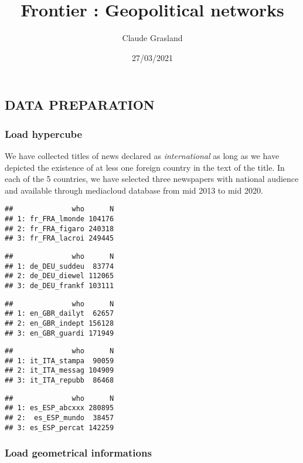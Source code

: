 \documentclass[
]{article}
\title{Frontier : Geopolitical networks}
\author{Claude Grasland}
\date{27/03/2021}
\begin{document}
\maketitle

\hypertarget{data-preparation}{%
\subsection{DATA PREPARATION}\label{data-preparation}}

\hypertarget{load-hypercube}{%
\subsubsection{Load hypercube}\label{load-hypercube}}

We have collected titles of news declared as \emph{international} as
long as we have depicted the existence of at less one foreign country in
the text of the title. In each of the 5 countries, we have selected
three newspapers with national audience and available through mediacloud
database from mid 2013 to mid 2020.

\begin{verbatim}
##              who      N
## 1: fr_FRA_lmonde 104176
## 2: fr_FRA_figaro 240318
## 3: fr_FRA_lacroi 249445
\end{verbatim}

\begin{verbatim}
##              who      N
## 1: de_DEU_suddeu  83774
## 2: de_DEU_diewel 112065
## 3: de_DEU_frankf 103111
\end{verbatim}

\begin{verbatim}
##              who      N
## 1: en_GBR_dailyt  62657
## 2: en_GBR_indept 156128
## 3: en_GBR_guardi 171949
\end{verbatim}

\begin{verbatim}
##              who      N
## 1: it_ITA_stampa  90059
## 2: it_ITA_messag 104909
## 3: it_ITA_repubb  86468
\end{verbatim}

\begin{verbatim}
##              who      N
## 1: es_ESP_abcxxx 280895
## 2:  es_ESP_mundo  38457
## 3: es_ESP_percat 142259
\end{verbatim}

\hypertarget{load-geometrical-informations}{%
\subsubsection{Load geometrical
informations}\label{load-geometrical-informations}}
\end{document}
